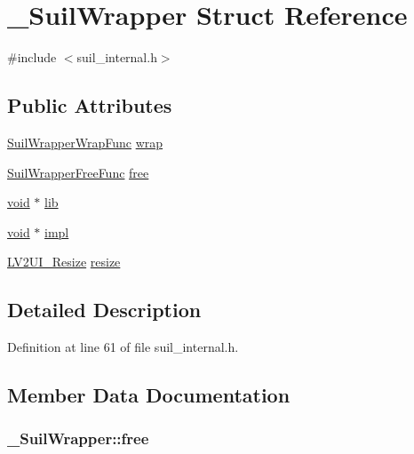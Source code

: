 \hypertarget{struct___suil_wrapper}{}\section{\+\_\+\+Suil\+Wrapper Struct Reference}
\label{struct___suil_wrapper}


{\ttfamily \#include $<$suil\+\_\+internal.\+h$>$}

\subsection*{Public Attributes}
\begin{DoxyCompactItemize}
\item 
\hyperlink{suil__internal_8h_a1f552184180f29541822da83dd0ed1d4}{Suil\+Wrapper\+Wrap\+Func} \hyperlink{struct___suil_wrapper_afcf34e2f9166985f483b08397ca94276}{wrap}
\item 
\hyperlink{suil__internal_8h_a00382627c75849c86dcdfec2de160e55}{Suil\+Wrapper\+Free\+Func} \hyperlink{struct___suil_wrapper_aa2dd9d8753e0ce60805c9f58e4d6b9aa}{free}
\item 
\hyperlink{sound_8c_ae35f5844602719cf66324f4de2a658b3}{void} $\ast$ \hyperlink{struct___suil_wrapper_aef41349133c89e26d472c35879599cf4}{lib}
\item 
\hyperlink{sound_8c_ae35f5844602719cf66324f4de2a658b3}{void} $\ast$ \hyperlink{struct___suil_wrapper_a3b9f069c2fc9e99ad07b07de0994cad7}{impl}
\item 
\hyperlink{ui_8h_a3f4a0128cdf2c342d93c71470d11ba11}{L\+V2\+U\+I\+\_\+\+Resize} \hyperlink{struct___suil_wrapper_a881d1aaf73b97b34059360b224b4edc3}{resize}
\end{DoxyCompactItemize}


\subsection{Detailed Description}


Definition at line 61 of file suil\+\_\+internal.\+h.



\subsection{Member Data Documentation}
\subsubsection[{\texorpdfstring{free}{free}}]{ \+\_\+\+Suil\+Wrapper\+::free}\hypertarget{struct___suil_wrapper_aa2dd9d8753e0ce60805c9f58e4d6b9aa}{}\label{struct___suil_wrapper_aa2dd9d8753e0ce60805c9f58e4d6b9aa}


